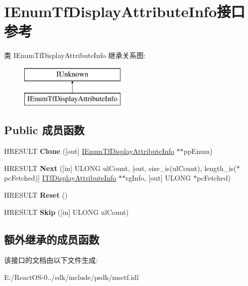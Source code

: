 \hypertarget{interface_i_enum_tf_display_attribute_info}{}\section{I\+Enum\+Tf\+Display\+Attribute\+Info接口 参考}
\label{interface_i_enum_tf_display_attribute_info}
类 I\+Enum\+Tf\+Display\+Attribute\+Info 继承关系图\+:\begin{figure}[H]
\begin{center}
\leavevmode
\includegraphics[height=2.000000cm]{interface_i_enum_tf_display_attribute_info}
\end{center}
\end{figure}
\subsection*{Public 成员函数}
\begin{DoxyCompactItemize}
\item 
\mbox{\label{interface_i_enum_tf_display_attribute_info_a0c9ef60c17e6cbe6a475024d516c3c82}} 
H\+R\+E\+S\+U\+LT {\bfseries Clone} (\mbox{[}out\mbox{]} \hyperlink{interface_i_enum_tf_display_attribute_info}{I\+Enum\+Tf\+Display\+Attribute\+Info} $\ast$$\ast$pp\+Enum)
\item 
\mbox{\label{interface_i_enum_tf_display_attribute_info_a35e669fc01402140960fbf342db556df}} 
H\+R\+E\+S\+U\+LT {\bfseries Next} (\mbox{[}in\mbox{]} U\+L\+O\+NG ul\+Count, \mbox{[}out, size\+\_\+is(ul\+Count), length\+\_\+is($\ast$pc\+Fetched)\mbox{]} \hyperlink{interface_i_tf_display_attribute_info}{I\+Tf\+Display\+Attribute\+Info} $\ast$$\ast$rg\+Info, \mbox{[}out\mbox{]} U\+L\+O\+NG $\ast$pc\+Fetched)
\item 
\mbox{\label{interface_i_enum_tf_display_attribute_info_aea8e7a309893cbd5a1d2ee5b10822f8d}} 
H\+R\+E\+S\+U\+LT {\bfseries Reset} ()
\item 
\mbox{\label{interface_i_enum_tf_display_attribute_info_a14299c3c9f8a76f2926c61090f5d20cd}} 
H\+R\+E\+S\+U\+LT {\bfseries Skip} (\mbox{[}in\mbox{]} U\+L\+O\+NG ul\+Count)
\end{DoxyCompactItemize}
\subsection*{额外继承的成员函数}


该接口的文档由以下文件生成\+:\begin{DoxyCompactItemize}
\item 
E\+:/\+React\+O\+S-\/0../sdk/include/psdk/msctf.\+idl\end{DoxyCompactItemize}
